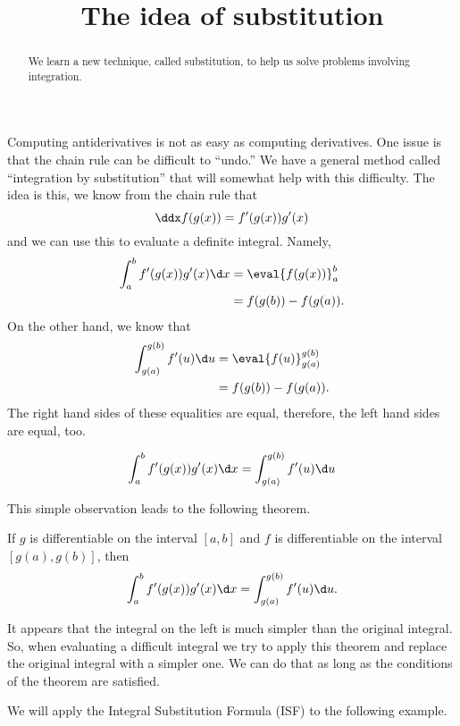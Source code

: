 \documentclass{ximera}
\title[Dig-In:]{The idea of substitution}
\begin{document}
\begin{abstract}
  We learn a new technique, called substitution, to help us solve
  problems involving integration.
\end{abstract}
\maketitle


Computing antiderivatives is not as easy as computing derivatives.
One issue is that the chain rule can be difficult to ``undo.''  We
have a general method called ``integration by substitution'' that will
somewhat help with this difficulty. The idea is this, we know from the
chain rule that
\[
\ddx f(g(x)) = f'(g(x))g'(x)
\]
and we can use this to evaluate a definite integral. Namely,
\begin{align*}
  \int_a^b f'(g(x))g'(x) \d x &= \eval{f(g(x))}_a^b \\
  &= f(g(b)) - f(g(a)). \\
 \end{align*}
On the other hand, we know that
\begin{align*}
  \int_{g(a)}^{g(b)} f'(u)\d u &= \eval{f(u)}_{g(a)}^{g(b)}\\
  &= f(g(b)) - f(g(a)). \\
 \end{align*}
 The right hand sides of these equalities are equal, therefore, the left hand sides are equal, too.
 
\[
  \int_a^b f'(g(x))g'(x) \d x =  \int_{g(a)}^{g(b)} f'(u)\d u
\]

 
This simple observation  leads to the following theorem. 


\begin{theorem} 
If $g$ is differentiable on the interval $[a,b]$ and $f$ is
differentiable on the interval $[g(a),g(b)]$, then
\[
\int_a^b f'(g(x)) g'(x) \d x =\int_{g(a)}^{g(b)} f'(u) \d u.
\]
\end{theorem}
It appears that the integral on the left is much simpler than the original integral.
So, when  evaluating a difficult integral we try to apply this theorem and replace the original integral with a simpler one.
 We can do that as long as the conditions of the theorem are satisfied.

We will apply the Integral Substitution Formula (ISF)  to the following example.
\end{document}
